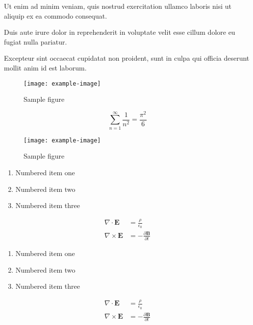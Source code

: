 \documentclass{article}
\begin{document}
Ut enim ad minim veniam, quis nostrud exercitation ullamco laboris nisi ut aliquip ex ea commodo consequat.

Duis aute irure dolor in reprehenderit in voluptate velit esse cillum dolore eu fugiat nulla pariatur.

Excepteur sint occaecat cupidatat non proident, sunt in culpa qui officia deserunt mollit anim id est laborum.

\begin{figure}[h]
    \centering
    \texttt{[image: example-image]}
    \caption{Sample figure}
    \label{fig:sample}
\end{figure}

\begin{equation}
    \sum_{n=1}^{\infty} \frac{1}{n^2} = \frac{\pi^2}{6}
\end{equation}

\begin{figure}[h]
    \centering
    \texttt{[image: example-image]}
    \caption{Sample figure}
    \label{fig:sample}
\end{figure}

\begin{enumerate}
\item Numbered item one
\item Numbered item two
\item Numbered item three
\end{enumerate}

\begin{align}
    \nabla \cdot \mathbf{E} &= \frac{\rho}{\epsilon_0} \\
    \nabla \times \mathbf{E} &= -\frac{\partial \mathbf{B}}{\partial t}
\end{align}

\begin{enumerate}
\item Numbered item one
\item Numbered item two
\item Numbered item three
\end{enumerate}

\begin{align}
    \nabla \cdot \mathbf{E} &= \frac{\rho}{\epsilon_0} \\
    \nabla \times \mathbf{E} &= -\frac{\partial \mathbf{B}}{\partial t}
\end{align}
\end{document}
